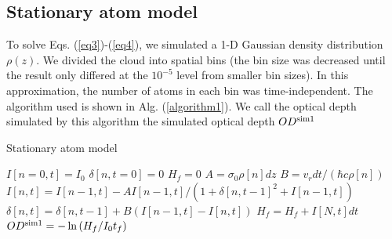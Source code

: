 \documentclass[12pt]{iopart}
\begin{document}
\subsection{Stationary atom model}
To solve Eqs. (\ref{eq3})-(\ref{eq4}), we simulated a 1-D Gaussian density distribution $\rho(z)$. We divided the cloud into spatial bins (the bin size was decreased until the result only differed at the $10^{-5}$ level from smaller bin sizes).  In this approximation, the number of atoms in each bin was time-independent.  The algorithm used is shown in Alg. (\ref{algorithm1}). We call the optical depth simulated by this algorithm the simulated optical depth $OD^{\rm{sim1}}$

\begin{algorithm}
\caption{Stationary atom model}
\label{algorithm1}
\begin{algorithmic}
\STATE $I[n=0,t]=I_0$ 
\STATE $\delta[n, t=0]=0$ 
\STATE $H_f=0$ 
 \STATE $A=\sigma_0\rho[n] dz$ 
 \STATE $B=v_r dt/(\hbar c \rho[n])$  
\STATE $I[n,t]=I[n-1,t] - A I[n-1,t]/(1+\delta[n,t-1]^2+I[n-1,t])$  
\STATE $\delta[n,t]=\delta[n,t-1]+B\left(I[n-1,t]-I[n,t]\right)$  
\ENDFOR
\STATE $H_f =H_f+ I[N,t]dt$ 
\ENDFOR
\STATE $OD^{\rm{sim1}}=-\ln{(H_f/I_0t_f)}$
\end{algorithmic}
\end{algorithm}
\end{document}
